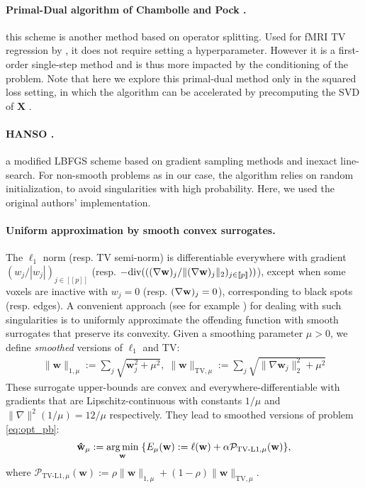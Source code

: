 \paragraph{Primal-Dual algorithm of Chambolle and Pock  \citep{chambolle2010}.}
this scheme is another method based on operator splitting.
Used for fMRI TV regression by  \citep{gramfort-etal:2013a},
it does not require setting a hyperparameter.  %
However it is a first-order single-step method and is thus more impacted by the
conditioning of the problem. Note that here we explore this primal-dual
method only in the squared loss setting, in which the algorithm can be accelerated by
precomputing the SVD of $\mathbf{X}$  \citep{gramfort-etal:2013a}
.

\paragraph{HANSO  \citep{lewis2008}.}
a modified LBFGS scheme based on gradient 
sampling methods  \citep{burke2005} and inexact
line-search. For non-smooth problems as in our case, the algorithm relies on
random initialization, to avoid singularities with high probability. 
Here, we used the original authors' implementation.

\paragraph{Uniform approximation by smooth convex surrogates.}
The $\ell_{1}$ norm (resp. TV semi-norm) is differentiable everywhere with
gradient $\left(w_j/|w_j|\right)_{j \in [\![p]\!]}$ (resp. $-\textrm{div} (((\nabla \mathbf{w})_j/\|(\nabla \mathbf{w})_j\|_2)_{j \in [\![p]\!]}))$), except when some voxels are inactive with
$w_j = 0$ (resp. $(\nabla \mathbf{w})_j = 0$), corresponding to black spots (resp. edges).  A convenient
approach (see for example  \citep{NESTA, nesterov2005a, nesterov2005b,
  beck2012}) for dealing with such singularities is to uniformly
approximate the offending function with smooth surrogates that
preserve its convexity. Given  %
a smoothing parameter $\mu > 0$, we define \emph{smoothed} versions
of $\ell_1$ and TV:
%
\begin{eqnarray}
    \|\mathbf{w}\|_{1,\mu} := \sum_j
    \sqrt{\mathbf{w}_j^2 + \mu^2},\;
    \|\mathbf{w}\|_{\text{TV}, \mu} :=
    \sum_{j} \sqrt{\|\nabla \mathbf{w}_j\|_{2}^2 + \mu^2}
\end{eqnarray}
These surrogate upper-bounds are convex and everywhere-differentiable
with gradients that are Lipschitz-continuous with constants $1/\mu$ and
$\|\nabla\|^2(1/\mu) = 12 / \mu$ respectively.
They lead to smoothed versions of problem \eqref{eq:opt_pb}:
\begin{align}
  \mathbf{\hat{w}}_{\mu} := \operatorname*{arg\,min}_{\mathbf{w}}\;
  \{E_{\mu}(\mathbf{w}) := \ell(\mathbf{w}) + \alpha
    \mathcal P_{\text{TV-L1},\mu}(\mathbf{w})\},
  \label{eq:sopt_pb}
\end{align}
where    $\mathcal P_{\text{TV-L1},\mu}(\mathbf{w}) :=\rho \|\mathbf{w}\|_{1,\mu} +
(1 - \rho)\|\mathbf{w}\|_{\text{TV}, \mu}$.

